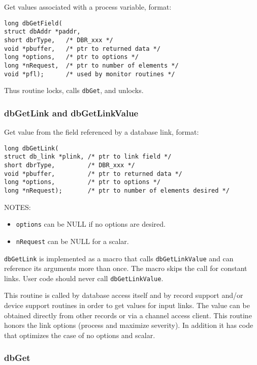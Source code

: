 Get values associated with a process variable, format:

\begin{verbatim}long dbGetField(
struct dbAddr *paddr,
short dbrType,   /* DBR_xxx */
void *pbuffer,   /* ptr to returned data */
long *options,   /* ptr to options */
long *nRequest,  /* ptr to number of elements */
void *pfl);      /* used by monitor routines */
\end{verbatim}Thus routine locks, calls \verb|dbGet|, and unlocks.

\subsubsection{dbGetLink and dbGetLinkValue}

Get value from the field referenced by a database link, format:

\begin{verbatim}long dbGetLink(
struct db_link *plink, /* ptr to link field */
short dbrType,         /* DBR_xxx */
void *pbuffer,         /* ptr to returned data */
long *options,         /* ptr to options */
long *nRequest);       /* ptr to number of elements desired */
\end{verbatim}
NOTES:

\begin{itemize}\item \verb|options| can be NULL if no options are desired.

\item \verb|nRequest| can be NULL for a scalar.

\end{itemize}\verb|dbGetLink| is implemented as a macro that calls \verb|dbGetLinkValue| and can reference its arguments more than once. 
The macro skips the call for constant links. User code should never call \verb|dbGetLinkValue|.

This routine is called by database access itself and by record support and/or device support routines in order to get values 
for input links. The value can be obtained directly from other records or via a channel access client. This routine honors 
the link options (process and maximize severity). In addition it has code that optimizes the case of no options and scalar.

\subsubsection{dbGet}

